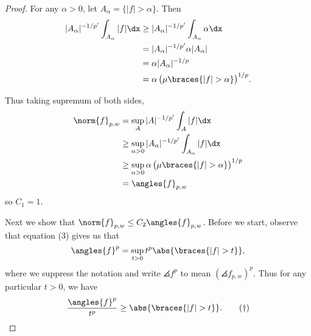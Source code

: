 \documentclass[12pt,letterpaper]{article}
\begin{document}
\begin{enumerate}
\begin{proof}
For any $\alpha>0$, let $A_\alpha=\{|f|>\alpha\}$. Then 
\begin{align*}
|A_\alpha|^{-1/p'}\int_{A_\alpha} |f|\dx & \geq |A_\alpha|^{-1/p'} \int_{A_\alpha}\alpha\dx \\
&= |A_\alpha|^{-1/p'} \alpha |A_\alpha| \\
&= \alpha|A_\alpha|^{-1/p} \\
&= \alpha\,\big(\mu\braces{|f|>\alpha}\big)^{1/p}.
\end{align*}

Thus taking supremum of both sides, 
\begin{align*}
\norm{f}_{p,w}&=\sup_A |A|^{-1/p'} \int_A |f| \dx\\
&\geq \sup_{\alpha>0} |A_\alpha|^{-1/p'} \int_{A_\alpha} |f| \dx\\
&\geq \sup_{\alpha>0} \alpha\,\big(\mu\braces{|f|>\alpha}\big)^{1/p}\\
&= \angles{f}_{p,w}
\end{align*}
so $C_1=1$. \qedwhite

Next we show that $\norm{f}_{p,w}\leq C_2\angles{f}_{p,w}$. Before we start, observe that equation (3) gives us that 
\begin{equation*}
\angles{f}^p=\sup_{t>0}t^p\abs{\braces{|f|>t}},
\end{equation*}
where we suppress the notation and write $\angles{f}^p$ to mean $(\angles{f}_{p,w})^p$. Thus for any particular $t>0$, we have 
\begin{equation}
\frac{\angles{f}^p}{t^p}\geq\abs{\braces{|f|>t}}. \tag{$\dagger$}
\end{equation}


\end{proof}
\end{enumerate}
\end{document}
